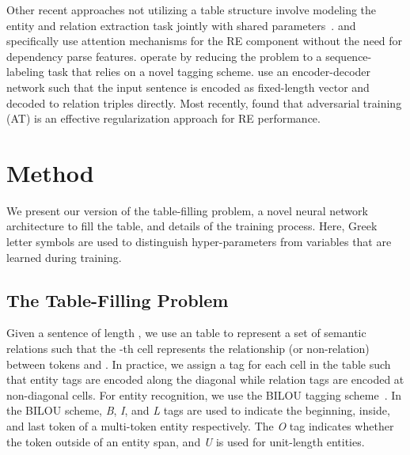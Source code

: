 \documentclass{clv3}
\newcommand{\ere}{RE}
\begin{document}
Other recent approaches not utilizing a table structure involve modeling the entity and relation extraction task jointly with shared parameters~\cite{miwa2016end,li2016joint,zheng2017joint_hybrid,li2017neural,katiyar2017going,bekoulis2018join,zeng2018extracting}.  and  specifically use attention mechanisms for the RE component without the need for dependency parse features.  operate by reducing the problem to a sequence-labeling task that relies on a novel tagging scheme.  use an encoder-decoder network such that the input sentence is encoded as fixed-length vector and decoded to relation triples directly. Most recently,  found that adversarial training (AT) is an effective regularization approach for \ere{} performance.

\section{Method}

We present our version of the table-filling problem, a novel neural network architecture  to fill the table, and details of the training process. Here, Greek letter symbols are used to distinguish hyper-parameters from variables that are learned during training. 

\subsection{The Table-Filling Problem}\label{sec-table-fill}

Given a sentence of length  , we  use an  table to represent a set of semantic relations such that the -th cell represents the relationship (or non-relation) between tokens  and . In practice, we assign a tag for each cell in the table such that entity tags are encoded along the diagonal while relation tags are encoded at non-diagonal cells. For entity recognition, we use the BILOU tagging scheme~\cite{ratinov2009design}. In the BILOU scheme, \emph{B}, \emph{I}, and \emph{L} tags are used to indicate the beginning, inside, and last token of a multi-token entity respectively. The \emph{O} tag  indicates whether the token outside of an entity span, and \emph{U} is used for unit-length entities. 
\end{document}
